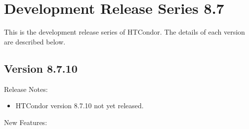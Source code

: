 
\section{Development Release Series 8.7}\label{sec:History-8-7}

This is the development release series of HTCondor.
The details of each version are described below.

\subsection*{\label{sec:New-8-7-10}Version 8.7.10}

\noindent Release Notes:

\begin{itemize}

\item HTCondor version 8.7.10 not yet released.

\end{itemize}


\noindent New Features:

